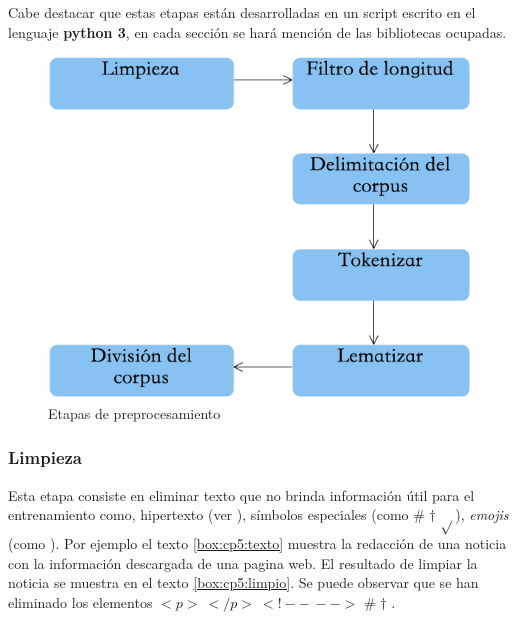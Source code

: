 Cabe destacar que estas etapas están desarrolladas en un script escrito en el lenguaje \textbf{python 3}, en cada sección se hará mención de las bibliotecas ocupadas.\\

\begin{figure}[h]
\centering
\includegraphics[scale=.55]{imagenes/capitulo5/Entrenamiento/preprocesamiento.png}
\caption{Etapas de preprocesamiento}
\label{fig:cp5:preprocesamiento}
\end{figure}

\subsubsection{Limpieza}

Esta etapa consiste en eliminar texto que no brinda información útil para el entrenamiento como, hipertexto (ver ), símbolos especiales (como \# $\dagger$ $\sqrt{ }$), \textit{emojis} (como \dSmiley \dCooley \dNinja). Por ejemplo el texto \ref{box:cp5:texto} muestra la redacción de una noticia con la información descargada de una pagina web. El resultado de limpiar la noticia se muestra en el texto \ref{box:cp5:limpio}. Se puede observar que se han eliminado los elementos $<p>\ </p>\ <!--\ -->$ \# $\dagger$ \dSmiley \dCooley \dInnocey.\\

